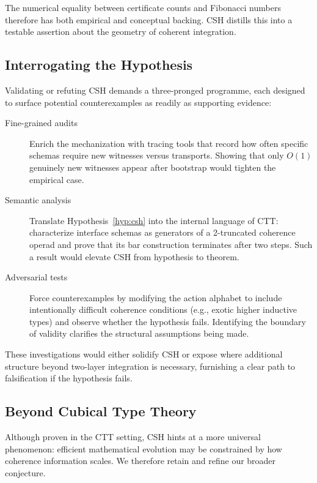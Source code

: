 \documentclass[11pt]{article}
\theoremstyle{definition}
\theoremstyle{plain}
\theoremstyle{remark}
\begin{document}
The numerical equality between certificate counts and Fibonacci numbers therefore has both empirical and conceptual backing. CSH distills this into a testable assertion about the geometry of coherent integration.

\subsection{Interrogating the Hypothesis}

Validating or refuting CSH demands a three-pronged programme, each designed to surface potential counterexamples as readily as supporting evidence:
\begin{description}
\item[Fine-grained audits] Enrich the mechanization with tracing tools that record how often specific schemas require new witnesses versus transports. Showing that only $O(1)$ genuinely new witnesses appear after bootstrap would tighten the empirical case.
\item[Semantic analysis] Translate Hypothesis~\ref{hyp:csh} into the internal language of CTT: characterize interface schemas as generators of a 2-truncated coherence operad and prove that its bar construction terminates after two steps. Such a result would elevate CSH from hypothesis to theorem.
\item[Adversarial tests] Force counterexamples by modifying the action alphabet to include intentionally difficult coherence conditions (e.g., exotic higher inductive types) and observe whether the hypothesis fails. Identifying the boundary of validity clarifies the structural assumptions being made.
\end{description}

These investigations would either solidify CSH or expose where additional structure beyond two-layer integration is necessary, furnishing a clear path to falsification if the hypothesis fails.

\subsection{Beyond Cubical Type Theory}

Although proven in the CTT setting, CSH hints at a more universal phenomenon: efficient mathematical evolution may be constrained by how coherence information scales. We therefore retain and refine our broader conjecture.
\end{document}
